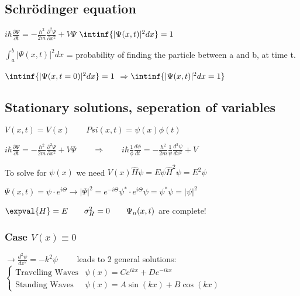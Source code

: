 \documentclass[10pt,a4paper]{scrartcl}
\begin{document}
\begin{multicols*}{2}
\begin{tabular}{ll}
	\end{tabular}
	
\end{multicols*}
\begin{multicols*}{3}
\parindent 0pt
\setlength{\columnseprule}{1pt}
	
	\section{Schrödinger equation}
	
	$i\hbar \frac{\partial\Psi}{\partial t}=-\frac{\hbar^2}{2m}\frac{\partial^2\Psi}{\partial x^2}+V\Psi$ \hfill$\intinf{|\Psi(x,t)|^2dx}=1$
	
	$\int_a^b{|\Psi(x,t)|^2dx}$ = probability of finding the particle between a and b, at time t.
	
	$\intinf{|\Psi(x,t=0)|^2dx}=1$	\hfill$\Longrightarrow$\hfill$ \intinf{|\Psi(x,t)|^2dx=1}$
	
	\subsection{Stationary solutions, seperation of variables}
	
	$V(x,t)=V(x)\qquad Psi(x,t)=\psi(x)\phi(t)$
	
	$i\hbar \frac{\partial\Psi}{\partial t}=-\frac{\hbar^2}{2m}\frac{\partial^2\Psi}{\partial x^2}+V\Psi\qquad \Rightarrow \qquad i\hbar\frac{1}{\phi}\frac{d\phi}{dt}=-\frac{\hbar^2}{2m}\frac{1}{\psi}\frac{d^2\psi}{dx^2}+V$
	
	\hfill{}
	
	To solve for $\psi(x)$ we need $V(x)$\hfill $\hat{H}\psi=E\psi$\hfill$\hat{H}^2\psi=E^2\psi$
	
	$\Psi(x,t)=\psi\cdot e^{i\Theta}\rightarrow |\Psi|^2=e^{-i\Theta}\psi^\ast\cdot e^{i\Theta}\psi=\psi^\ast\psi=|\psi|^2$
	
	$\expval{H}=E\qquad\sigma_H^2=0\qquad \Psi_n(x,t)$ are complete!
	
	\subsubsection{Case $V(x)\equiv 0$} 
	
	$\rightarrow \frac{d^2\psi}{dx^2}=-k^2\psi\qquad$ leads to 2 general solutions: $\begin{cases}
	\text{Travelling Waves}&\psi(x)=Ce^{ikx}+De^{-ikx}\\
	\text{Standing Waves}&\psi(x)=A\sin(kx)+B\cos(kx)	
	\end{cases}$
	

\end{multicols*}
\end{document}

